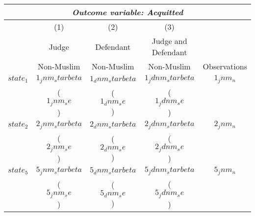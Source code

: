 {
\def\sym#1{\ifmmode^{#1}\else\(^{#1}\)\fi}
\begin{tabular}{l*{4}{c}}
  \hline\hline
\multicolumn{5}{c}{\textit{Outcome variable: Acquitted}}\\
\hline
&\multicolumn{1}{c}{(1)}&\multicolumn{1}{c}{(2)}&\multicolumn{1}{c}{(3)} &\multicolumn{1}{c}{}\\

\hspace{15mm}& Judge & Defendant & Judge and Defendant  \\

\hspace{15mm}& Non-Muslim & Non-Muslim & Non-Muslim  & Observations  \\
\hline 

$$state_1$$ \hspace{15mm} & $$1_jnm_starbeta$$ & $$1_dnm_starbeta$$ & $$1_jdnm_starbeta$$ & $$1_jnm_n$$ \\
                          & ($$1_jnm_se$$)     & ($$1_dnm_se$$)     & ($$1_jdnm_se$$)                   \\[2.5mm]
\hline 

$$state_2$$ \hspace{15mm} & $$2_jnm_starbeta$$ & $$2_dnm_starbeta$$ & $$2_jdnm_starbeta$$ & $$2_jnm_n$$ \\
                          & ($$2_jnm_se$$)     & ($$2_dnm_se$$)     & ($$2_jdnm_se$$)                   \\[2.5mm]
\hline 

$$state_5$$ \hspace{15mm} & $$5_jnm_starbeta$$ & $$5_dnm_starbeta$$ & $$5_jdnm_starbeta$$ & $$5_jnm_n$$ \\
                          & ($$5_jnm_se$$)     & ($$5_dnm_se$$)     & ($$5_jdnm_se$$)                   \\[2.5mm]
\hline


\end{tabular}}
